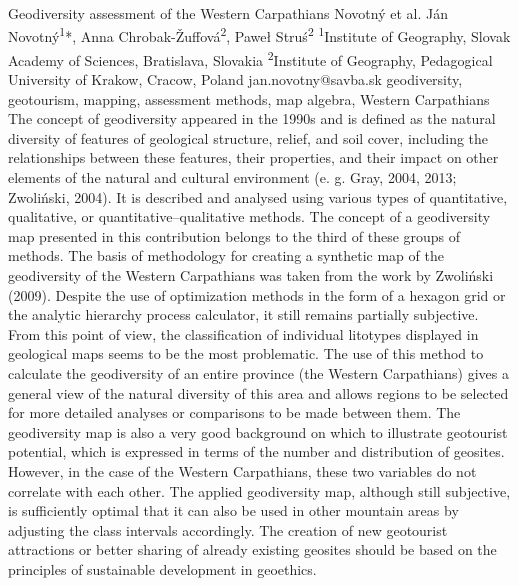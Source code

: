 \abstract
{Geodiversity assessment of the Western Carpathians} 
{Novotný et al.} 
{Ján Novotný\textsuperscript{1}*, Anna Chrobak-Žuffová\textsuperscript{2}, Paweł Struś\textsuperscript{2}} 
{\TLtag} 
{
\textsuperscript{1}Institute of Geography, Slovak Academy of Sciences, Bratislava, Slovakia
\textsuperscript{2}Institute of Geography, Pedagogical University of Krakow, Cracow, Poland
}
{jan.novotny@savba.sk}  %
{geodiversity, geotourism, mapping, assessment methods, map algebra, Western Carpathians}
{
The concept of geodiversity appeared in the 1990s and is defined as the natural diversity of features of geological structure, relief, and soil cover, including the relationships between these features, their properties, and their impact on other elements of the natural and cultural environment (e. g. Gray, 2004, 2013; Zwoliński, 2004). It is described and analysed using various types of quantitative, qualitative, or quantitative–qualitative methods. The concept of a geodiversity map presented in this contribution belongs to the third of these groups of methods. The basis of methodology for creating a synthetic map of the geodiversity of the Western Carpathians was taken from the work by Zwoliński (2009). Despite the use of optimization methods in the form of a hexagon grid or the analytic hierarchy process calculator, it still remains partially subjective. From this point of view, the classification of individual litotypes displayed in geological maps seems to be the most problematic. The use of this method to calculate the geodiversity of an entire province (the Western Carpathians) gives a general view of the natural diversity of this area and allows regions to be selected for more detailed analyses or comparisons to be made between them. The geodiversity map is also a very good background on which to illustrate geotourist potential, which is expressed in terms of the number and distribution of geosites. However, in the case of the Western Carpathians, these two variables do not correlate with each other. The applied geodiversity map, although still subjective, is sufficiently optimal that it can also be used in other mountain areas by adjusting the class intervals accordingly. The creation of new geotourist attractions or better sharing of already existing geosites should be based on the principles of sustainable development in geoethics.
}

